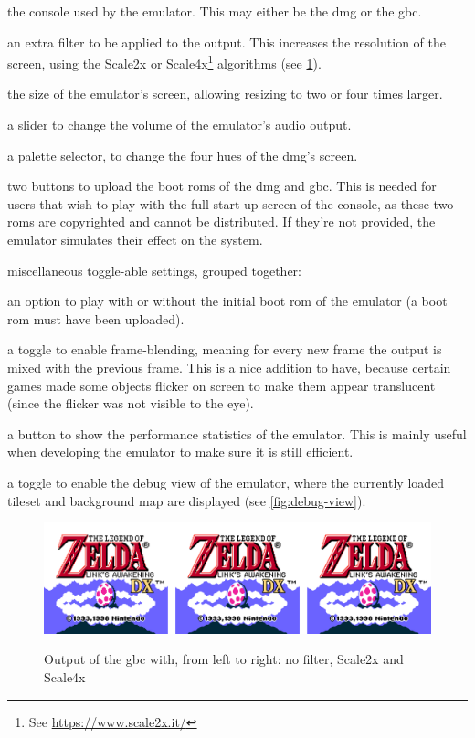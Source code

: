 \documentclass[11pt]{informatics-report}
\newcommand{\ftnt}[1]{\footnote{See \url{#1}}}
\begin{document}
\begin{compactitem}
	\item the console used by the emulator. This may either be the \gls{dmg} or the \gls{gbc}.
	\item an extra filter to be applied to the output. This increases the resolution of the screen, using the Scale2x or Scale4x\ftnt{https://www.scale2x.it/} algorithms (see \ref{fig:scale-filter}).
	\item the size of the emulator's screen, allowing resizing to two or four times larger.
	\item a slider to change the volume of the emulator's audio output.
	\item a palette selector, to change the four hues of the \gls{dmg}'s screen.
	\item two buttons to upload the boot \glspl{rom} of the \gls{dmg} and \gls{gbc}. This is needed for users that wish to play with the full start-up screen of the console, as these two \glspl{rom} are copyrighted and cannot be distributed. If they're not provided, the emulator simulates their effect on the system.
	\item miscellaneous toggle-able settings, grouped together:
	\begin{compactitem}
		\item an option to play with or without the initial boot \gls{rom} of the emulator (a boot \gls{rom} must have been uploaded).
		\item a toggle to enable frame-blending, meaning for every new frame the output is mixed with the previous frame. This is a nice addition to have, because certain games made some objects flicker on screen to make them appear translucent (since the flicker was not visible to the eye).
		\item a button to show the performance statistics of the emulator. This is mainly useful when developing the emulator to make sure it is still efficient.
		\item a toggle to enable the debug view of the emulator, where the currently loaded tileset and background map are displayed (see \ref{fig:debug-view}).
	\end{compactitem}
\end{compactitem}

\begin{figure}[h]
    \centering
    \includegraphics[width=15cm]{images/scale-filter}\\
    \caption{Output of the \gls{gbc} with, from left to right: no filter, Scale2x and Scale4x}
    \label{fig:scale-filter}
\end{figure}
\end{document}

